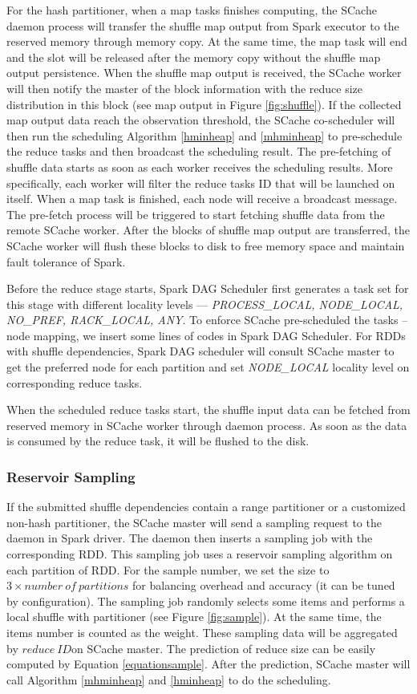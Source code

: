 For the hash partitioner, when a map tasks finishes computing, the SCache daemon process will transfer the shuffle map output from Spark executor to the reserved memory through memory copy.
At the same time, the map task will end and the slot will be released after the memory copy without the shuffle map output persistence.
When the shuffle map output is received, the SCache worker will then notify the master of the block information with the reduce size distribution in this block (see map output in Figure \ref{fig:shuffle}).
If the collected map output data reach the observation threshold, the SCache co-scheduler will then run the scheduling Algorithm \ref{hminheap} and \ref{mhminheap} to pre-schedule the reduce tasks and then broadcast the scheduling result.
The pre-fetching of shuffle data starts as soon as each worker receives the scheduling results.
More specifically, each worker will filter the reduce tasks ID that will be launched on itself.
When a map task is finished, each node will receive a broadcast message. The pre-fetch process will be triggered to start fetching shuffle data from the remote SCache worker. After the blocks of shuffle map output are transferred, the SCache worker will flush these blocks to disk to free memory space and maintain fault tolerance of Spark.

Before the reduce stage starts, Spark DAG Scheduler first generates a task set for this stage with different locality levels --- \textit{PROCESS\_LOCAL, NODE\_LOCAL, NO\_PREF, RACK\_LOCAL, ANY}.
To enforce SCache pre-scheduled the tasks -- node mapping, we insert some lines of codes in Spark DAG Scheduler.
For RDDs with shuffle dependencies, Spark DAG scheduler will consult SCache master to get the preferred node for each partition and set \textit{NODE\_LOCAL} locality level on corresponding reduce tasks.

When the scheduled reduce tasks start, the shuffle input data can be fetched from reserved memory in SCache worker through daemon process. As soon as the data is consumed by the reduce task, it will be flushed to the disk.

\subsubsection{Reservoir Sampling}\label{sampling}
If the submitted shuffle dependencies contain a range partitioner or a customized non-hash partitioner, the SCache master will send a sampling request to the daemon in Spark driver. The daemon then inserts a sampling job with the corresponding RDD. This sampling job uses a reservoir sampling algorithm \cite{reservoir} on each partition of RDD. For the sample number, we set the size to $3 \times number\ of\ partitions$ for balancing overhead and accuracy (it can be tuned by configuration). The sampling job randomly selects some items and performs a local shuffle with partitioner (see Figure \ref{fig:sample}). At the same time, the items number is counted as the weight. These sampling data will be aggregated by $reduce\ ID$on SCache master. The prediction of reduce size can be easily computed by Equation \ref{equationsample}. After the prediction, SCache master will call Algorithm \ref{mhminheap} and \ref{hminheap} to do the scheduling.

